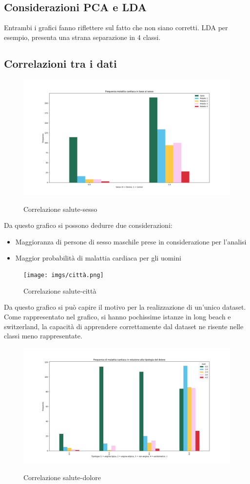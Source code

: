 \documentclass[a4paper]{article}
\begin{document}
\subsection{Considerazioni PCA e LDA}

    Entrambi i grafici fanno riflettere sul fatto che non siano corretti.
    LDA per esempio, presenta una strana separazione in 4 classi. 

    \clearpage

    \subsection{Correlazioni tra i dati}

    \begin{figure}[h!]
        \centering
        \includegraphics[width=0.5\linewidth]{imgs/sesso.png}
        \label{fig:sesso}
        \caption{Correlazione salute-sesso}
    \end{figure}

    Da questo grafico si possono dedurre due considerazioni:
    \begin{itemize}
        \item Maggioranza di persone di sesso maschile prese in considerazione per l'analisi
        \item Maggior probabilità di malattia cardiaca per gli uomini
    \end{itemize}

    \begin{figure}[h!]
        \centering
        \texttt{[image: imgs/città.png]}
        \label{fig:citta}
        \caption{Correlazione salute-città}
    \end{figure}
    
    Da questo grafico si può capire il motivo per la realizzazione di un'unico dataset.
    Come rappresentato nel grafico, si hanno pochissime istanze in long beach e switzerland,
    la capacità di apprendere correttamente dal dataset ne risente nelle classi meno rappresentate.

    \begin{figure}[h!]
        \centering
        \includegraphics[width=0.5\linewidth]{imgs/tipologia dolore.png}
        \label{fig:dolore}
        \caption{Correlazione salute-dolore}
    \end{figure}
\end{document}

